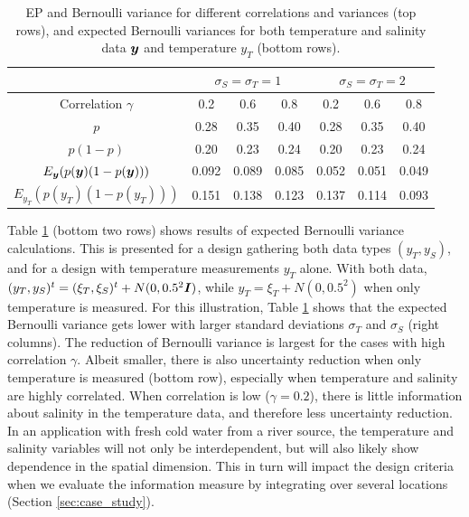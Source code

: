 \documentclass[aoas]{imsart}
\begin{document}
\begin{table}[!h] \centering \caption{EP and Bernoulli variance for
    different correlations and variances (top rows), and expected
    Bernoulli variances for both temperature and salinity data ${\boldsymbol y}$ and 
    temperature $y_T$ (bottom rows).}
  \begin{tabular}{c|ccc|ccc}
 &\multicolumn{3}{c}{$\sigma_S=\sigma_T=1$} & \multicolumn{3}{c}{$\sigma_S=\sigma_T=2$} \\
\hline
Correlation $\gamma$ & 0.2 & 0.6 & 0.8 & 0.2 & 0.6 & 0.8 \\
\hline
$p$ & 0.28 & 0.35 & 0.40 & 0.28 & 0.35 & 0.40 \\ 
$p(1-p)$ & 0.20 & 0.23 & 0.24 & 0.20 & 0.23 & 0.24 \\ 
$E_{{\boldsymbol y}}(p({\boldsymbol y}) (1-p({\boldsymbol y})))$ & 0.092 & 0.089 & 0.085 & 0.052 & 0.051 & 0.049 \\ 
$E_{y_T}(p(y_T) (1-p(y_T)))$ & 0.151 & 0.138 & 0.123 & 0.137 & 0.114 & 0.093 \\ 
\hline
\end{tabular}
\label{tab:sim_rhoab}
\end{table}

Table \ref{tab:sim_rhoab} (bottom two rows) shows results of expected
Bernoulli variance calculations. This is presented for a design
gathering both data types $(y_T,y_S)$, and for a design with
temperature measurements $y_T$ alone. With both data,
$(y_T,y_S)^t=(\xi_T,\xi_S)^t+N(0,0.5^2{\boldsymbol I})$, while
$y_T=\xi_T+N(0,0.5^2)$ when only temperature is measured.  For this
illustration, Table \ref{tab:sim_rhoab} shows that the expected
Bernoulli variance gets lower with larger standard deviations
$\sigma_T$ and $\sigma_S$ (right columns). The reduction of Bernoulli
variance is largest for the cases with high correlation
$\gamma$. Albeit smaller, there is also uncertainty reduction when
only temperature is measured (bottom row), especially when temperature
and salinity are highly correlated. When correlation is low
($\gamma=0.2$), there is little information about salinity in the
temperature data, and therefore less uncertainty reduction. In an
application with fresh cold water from a river source, the temperature
and salinity variables will not only be interdependent, but will also
likely show dependence in the spatial dimension. This in turn will
impact the design criteria when we evaluate the information measure by
integrating over several locations (Section \ref{sec:case_study}).

\end{document}
